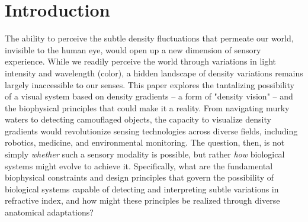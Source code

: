 \documentclass[11pt]{article}
\begin{document}
\newpage

\section{Introduction}

The ability to perceive the subtle density fluctuations that permeate our world, invisible to the human eye, would open up a new dimension of sensory experience. While we readily perceive the world through variations in light intensity and wavelength (color), a hidden landscape of density variations remains largely inaccessible to our senses. This paper explores the tantalizing possibility of a visual system based on density gradients – a form of "density vision" – and the biophysical principles that could make it a reality. From navigating murky waters to detecting camouflaged objects, the capacity to visualize density gradients would revolutionize sensing technologies across diverse fields, including robotics, medicine, and environmental monitoring. The question, then, is not simply \textit{whether} such a sensory modality is possible, but rather \textit{how} biological systems might evolve to achieve it. Specifically, what are the fundamental biophysical constraints and design principles that govern the possibility of biological systems capable of detecting and interpreting subtle variations in refractive index, and how might these principles be realized through diverse anatomical adaptations?
\end{document}
